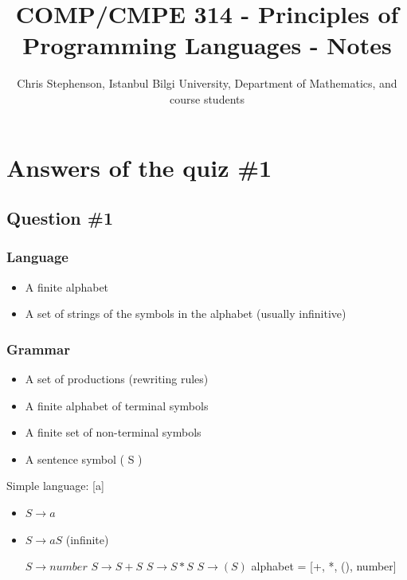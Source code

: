 \documentclass{article}
\begin{document}
\title{COMP/CMPE 314 - Principles of Programming Languages - Notes}
\author{Chris Stephenson, Istanbul Bilgi University, Department of Mathematics, and course students}
\maketitle


\section*{Answers of the quiz \#1}
\subsection*{Question \#1}
\subsubsection*{Language}
  \begin{itemize}
        \item A finite alphabet
        \item A set of strings of the symbols in the alphabet (usually infinitive)
   \end{itemize}
 
\subsubsection*{Grammar}
  \begin{itemize}
   \item A set of productions (rewriting rules)
   \item A finite alphabet of terminal symbols
   \item A finite set of non-terminal symbols
   \item A sentence symbol ( S )
  \end{itemize}

Simple language: [a] 
  \begin{itemize}
   \item $S \rightarrow a$
   \item $S \rightarrow aS$ (infinite)
   
   $S \rightarrow number$\newline
   $S \rightarrow S + S$\newline
   $S \rightarrow S * S$\newline
   $S \rightarrow (S)$\newline
   alphabet = [+, *, (), number]
  
  \end{itemize}
  
\end{document}
